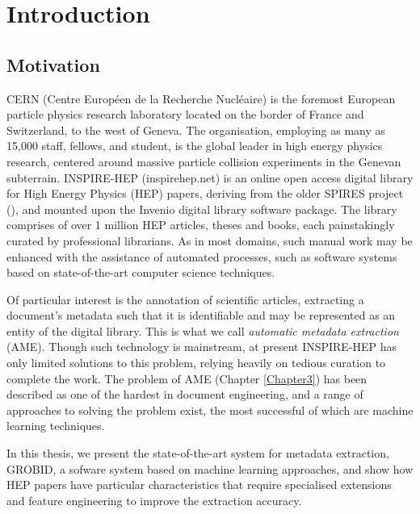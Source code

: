 
\chapter{Introduction} %

\label{Chapter1} %



\section{Motivation}

CERN (Centre Europ\'een de la Recherche Nucl\'eaire) is the foremost European particle physics research laboratory located on the border of France and Switzerland, to the west of Geneva. The organisation, employing as many as 15,000 staff, fellows, and student, is the global leader in high energy physics research, centered around massive particle collision experiments in the Genevan subterrain. INSPIRE-HEP (inspirehep.net) is an online open access digital library for High Energy Physics (HEP) papers, deriving from the older SPIRES project (\cite{gentil2009information}), and mounted upon the Invenio digital library software package. The library comprises of over 1 million HEP articles, theses and books, each painstakingly curated by professional librarians. As in most domains, such manual work may be enhanced with the assistance of automated processes, such as software systems based on state-of-the-art computer science techniques.

Of particular interest is the annotation of scientific articles, extracting a document's metadata such that it is identifiable and may be represented as an entity of the digital library. This is what we call \emph{automatic metadata extraction} (AME). Though such technology is mainstream, at present INSPIRE-HEP has only limited solutions to this problem, relying heavily on tedious curation to complete the work. The problem of AME (Chapter \ref{Chapter3}) has been described as one of the hardest in document engineering, and a range of approaches to solving the problem exist, the most successful of which are machine learning techniques.

In this thesis, we present the state-of-the-art system for metadata extraction, GROBID, a sofware system based on machine learning approaches, and show how HEP papers have particular characteristics that require specialised extensions and feature engineering to improve the extraction accuracy.


